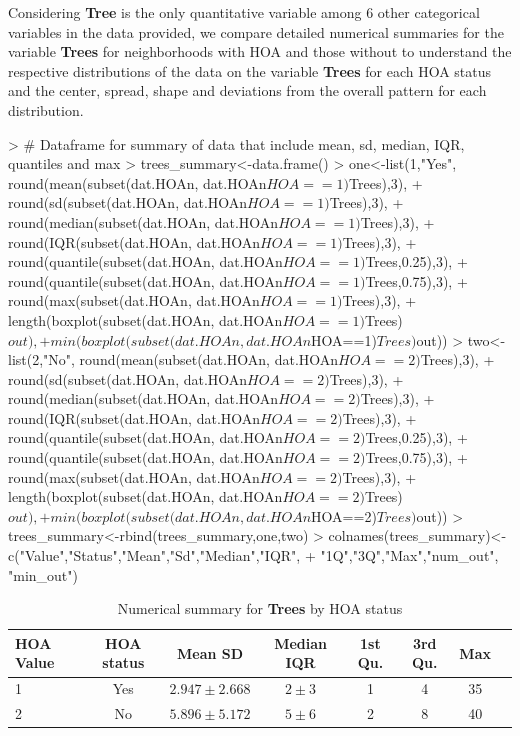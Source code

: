 \documentclass{article}
\begin{document}
Considering \textbf{Tree} is the only quantitative variable among 6 other categorical variables in the data provided, we compare detailed numerical summaries for the variable \textbf{Trees} for neighborhoods with HOA and those without to understand the respective distributions of the data on the variable \textbf{Trees} for each HOA status and the center, spread, shape and deviations from the overall pattern for each distribution. 

\begin{Schunk}
\begin{Sinput}
> # Dataframe for summary of data that include mean, sd, median, IQR, quantiles and max
> trees_summary<-data.frame()
> one<-list(1,"Yes", round(mean(subset(dat.HOAn, dat.HOAn$HOA==1)$Trees),3),
+           round(sd(subset(dat.HOAn, dat.HOAn$HOA==1)$Trees),3),
+           round(median(subset(dat.HOAn, dat.HOAn$HOA==1)$Trees),3),
+           round(IQR(subset(dat.HOAn, dat.HOAn$HOA==1)$Trees),3),
+           round(quantile(subset(dat.HOAn, dat.HOAn$HOA==1)$Trees,0.25),3),
+           round(quantile(subset(dat.HOAn, dat.HOAn$HOA==1)$Trees,0.75),3),
+           round(max(subset(dat.HOAn, dat.HOAn$HOA==1)$Trees),3),
+           length(boxplot(subset(dat.HOAn, dat.HOAn$HOA==1)$Trees)$out),
+           min(boxplot(subset(dat.HOAn, dat.HOAn$HOA==1)$Trees)$out))
> two<-list(2,"No", round(mean(subset(dat.HOAn, dat.HOAn$HOA==2)$Trees),3),
+           round(sd(subset(dat.HOAn, dat.HOAn$HOA==2)$Trees),3),
+           round(median(subset(dat.HOAn, dat.HOAn$HOA==2)$Trees),3),
+           round(IQR(subset(dat.HOAn, dat.HOAn$HOA==2)$Trees),3),
+           round(quantile(subset(dat.HOAn, dat.HOAn$HOA==2)$Trees,0.25),3),
+           round(quantile(subset(dat.HOAn, dat.HOAn$HOA==2)$Trees,0.75),3),
+           round(max(subset(dat.HOAn, dat.HOAn$HOA==2)$Trees),3),
+           length(boxplot(subset(dat.HOAn, dat.HOAn$HOA==2)$Trees)$out),
+           min(boxplot(subset(dat.HOAn, dat.HOAn$HOA==2)$Trees)$out))
> trees_summary<-rbind(trees_summary,one,two)
> colnames(trees_summary)<-c("Value","Status","Mean","Sd","Median","IQR",
+                            "1Q","3Q","Max","num_out", "min_out")
\end{Sinput}
\end{Schunk}

\begin{table}[H]
  \centering
    \begin{tabular}{lccccccc|}\hline
    HOA Value & HOA status & Mean SD & Median IQR & 1st Qu. & 3rd Qu. & Max \\\hline\hline
    1 & Yes & $2.947 \pm 2.668$
    & $2 \pm
    3$&1&4&
    35\\
    
    2 & No & $5.896 \pm 5.172$
    & $5 \pm
    6$&2&8&
    40\\
    
    \end{tabular}
    \caption{Numerical summary for \textbf{Trees} by HOA status}
  \end{table}
\end{document}
